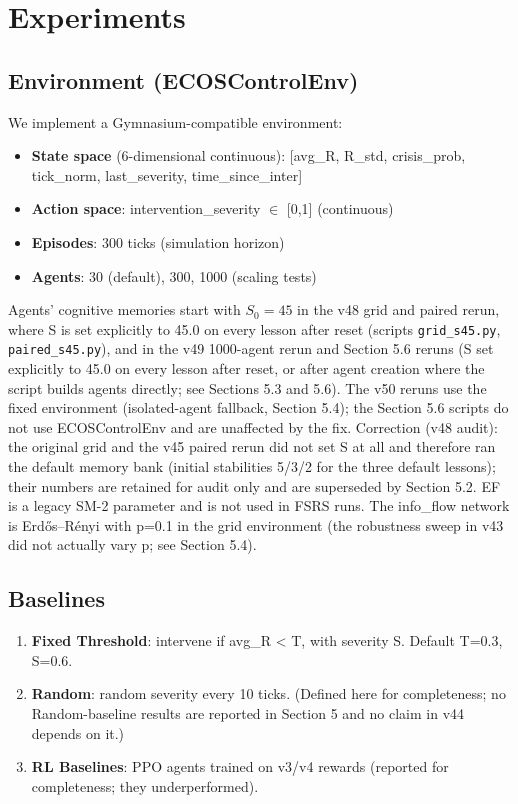 \documentclass[11pt]{article}
\begin{document}
\section{Experiments}
\subsection{Environment (ECOSControlEnv)}
We implement a Gymnasium-compatible environment:

\begin{itemize}
\item \textbf{State space} (6-dimensional continuous): [avg\_R, R\_std, crisis\_prob, tick\_norm, last\_severity, time\_since\_inter]
\item \textbf{Action space}: intervention\_severity $\in$ [0,1] (continuous)
\item \textbf{Episodes}: 300 ticks (simulation horizon)
\item \textbf{Agents}: 30 (default), 300, 1000 (scaling tests)
\end{itemize}

Agents' cognitive memories start with $S_0 = 45$ in the v48 grid and paired rerun, where S is set explicitly to 45.0 on every lesson after reset (scripts \texttt{grid\_s45.py}, \texttt{paired\_s45.py}), and in the v49 1000-agent rerun and Section 5.6 reruns (S set explicitly to 45.0 on every lesson after reset, or after agent creation where the script builds agents directly; see Sections 5.3 and 5.6). The v50 reruns use the fixed environment (isolated-agent fallback, Section 5.4); the Section 5.6 scripts do not use ECOSControlEnv and are unaffected by the fix. Correction (v48 audit): the original grid and the v45 paired rerun did not set S at all and therefore ran the default memory bank (initial stabilities 5/3/2 for the three default lessons); their numbers are retained for audit only and are superseded by Section 5.2. EF is a legacy SM-2 parameter and is not used in FSRS runs. The info\_flow network is Erdős--Rényi with p=0.1 in the grid environment (the robustness sweep in v43 did not actually vary p; see Section 5.4).

\subsection{Baselines}
\begin{enumerate}
\item \textbf{Fixed Threshold}: intervene if avg\_R < T, with severity S. Default T=0.3, S=0.6.
\item \textbf{Random}: random severity every 10 ticks. (Defined here for completeness; no Random-baseline results are reported in Section 5 and no claim in v44 depends on it.)
\item \textbf{RL Baselines}: PPO agents trained on v3/v4 rewards (reported for completeness; they underperformed).
\end{enumerate}
\end{document}
